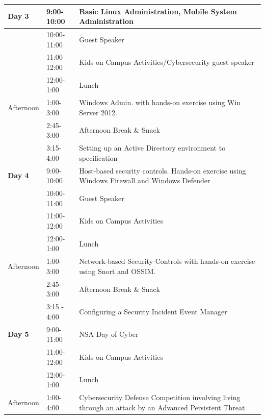 \documentclass[12pt]{article}
\begin{document}
\begin{table}[h]
\begin{center}
\begin{tabular}{| l | l | p{4.5in} | }
 \textbf{Day 3}	& 	9:00-10:00 &	Basic Linux Administration, Mobile System Administration \\ \hline
	& 10:00-11:00 &	Guest Speaker \\ \hline
&	11:00-12:00 &	Kids on Campus Activities/Cybersecurity guest speaker \\ \hline
&	12:00-1:00 & Lunch  \\ \hline
Afternoon &	1:00-3:00 &	Windows Admin. with hands-on exercise using Win Server 2012.\\ \hline
    & 2:45-3:00 &	Afternoon Break \& Snack \\ \hline
&	3:15-4:00 &	Setting up an Active Directory environment to specification \\ \hline \hline


\textbf{Day 4} & 9:00-10:00 &	Host-based security controls. Hands-on exercise using Windows Firewall and Windows Defender \\ \hline
	& 10:00-11:00 &	Guest Speaker \\ \hline
&	11:00-12:00 &	Kids on Campus Activities \\ \hline
&	12:00-1:00 &	Lunch \\ \hline
Afternoon &	1:00-3:00 &	Network-based Security Controls with hands-on exercise using Snort and OSSIM. \\ \hline
    & 2:45-3:00 &	Afternoon Break \& Snack \\ \hline
&	3:15 - 4:00 &	Configuring a Security Incident Event Manager  \\ \hline \hline


\textbf{Day 5} &	9:00-11:00 &	NSA Day of Cyber \\ \hline
&	11:00-12:00 &	Kids on Campus Activities \\ \hline
&	12:00-1:00 &	Lunch \\ \hline
Afternoon &	1:00-4:00 & Cybersecurity Defense Competition involving living through an attack by an Advanced Persistent Threat \\ \hline






   \end{tabular}
  \end{center}
\end{table}
\end{document}
